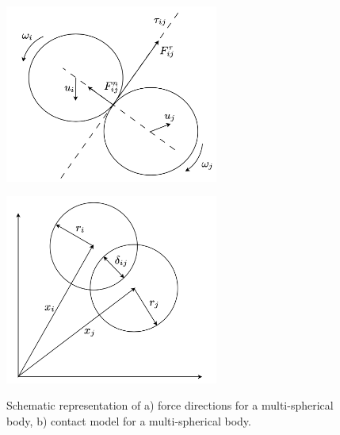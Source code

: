\begin{figure}[!htp]
\centering
\parbox{7cm}{
\includegraphics[width=7cm]{Images/particle_model_2.png}
\subcaption{}
\label{fig:2figsA}}
\qquad
\begin{minipage}{7cm}
\includegraphics[width=7cm]{Images/particle_model.png}
\subcaption{}
\label{fig:2figsB}
\end{minipage}
\caption{Schematic representation of a) force directions for a multi-spherical body, b) contact model for a multi-spherical body.}
\end{figure}

